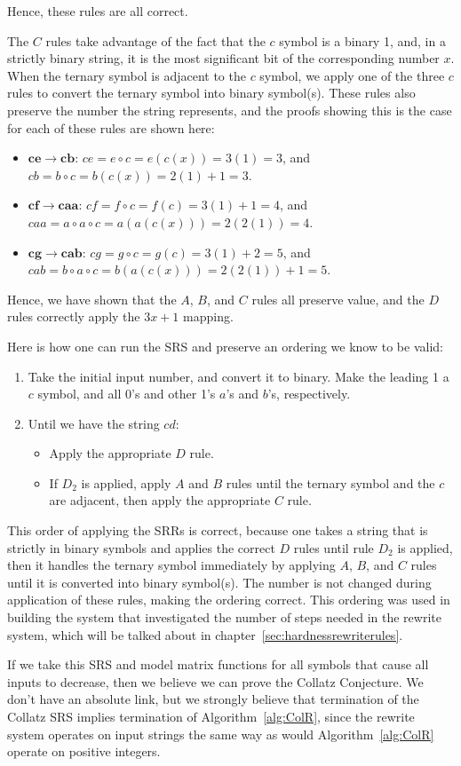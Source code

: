 Hence, these rules are all correct. \par
The $C$ rules take advantage of the fact that the $c$ symbol is a binary 1, and, in a strictly binary string, it is the most significant bit of the corresponding number $x$. When the ternary symbol is adjacent to the $c$ symbol, we apply one of the three $c$ rules to convert the ternary symbol into binary symbol(s). These rules also preserve the number the string represents, and the proofs showing this is the case for each of these rules are shown here:
\begin{itemize}
    \item $\boldsymbol{ce \rightarrow cb}$: $ce = e \circ c = e(c(x)) = 3(1) = 3$, and $cb = b
    \circ c = b(c(x)) = 2(1)+1 = 3$.
    \item $\boldsymbol{cf \rightarrow caa}$: $cf = f \circ c = f(c) = 3(1)+ 1 = 4$, and $caa = a \circ a \circ c = a(a(c(x))) = 2(2(1)) = 4$.
    \item $\boldsymbol{cg \rightarrow cab}$: $cg = g \circ c = g(c) = 3(1)+ 2 = 5$, and $cab = b \circ a \circ c = b(a(c(x))) = 2(2(1))+1 = 5$.
\end{itemize}
Hence, we have shown that the $A$, $B$, and $C$ rules all preserve value, and the $D$ rules correctly apply the $3x+1$ mapping. \par
Here is how one can run the SRS and preserve an ordering we know to be valid:
\begin{enumerate}
    \item Take the initial input number, and convert it to binary. Make the leading 1 a $c$ symbol, and all 0's and other 1's $a$'s and $b$'s, respectively.
    \item Until we have the string $cd$: 
    \begin{itemize}
        \item Apply the appropriate $D$ rule.
        \item If $D_2$ is applied, apply $A$ and $B$ rules until the ternary symbol and the $c$ are adjacent, then apply the appropriate $C$ rule.
    \end{itemize}
\end{enumerate}
This order of applying the SRRs is correct, because one takes a string that is strictly in binary symbols and applies the correct $D$ rules until rule $D_2$ is applied, then it handles the ternary symbol immediately by applying $A$, $B$, and $C$ rules until it is converted into binary symbol(s). The number is not changed during application of these rules, making the ordering correct. This ordering was used in building the system that investigated the number of steps needed in the rewrite system, which will be talked about in chapter~\ref{sec:hardnessrewriterules}. \par
If we take this SRS and model matrix functions for all symbols that cause all inputs to decrease, then we believe we can prove the Collatz Conjecture. We don't have an absolute link, but we strongly believe that termination of the Collatz SRS implies termination of Algorithm~\ref{alg:ColR}, since the rewrite system operates on input strings the same way as would Algorithm~\ref{alg:ColR} operate on positive integers.

